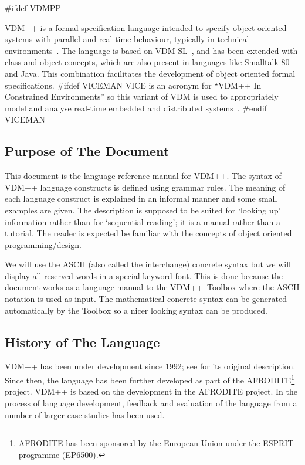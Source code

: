 \documentclass[\pformat,12pt]{article}
\newcommand{\vdmsl}{VDM-SL}
\newcommand{\vdmpp}{VDM++}
\begin{document}
#ifdef VDMPP

{\vdmpp} is a formal specification language intended to specify
object oriented systems with parallel 
and real-time 
behaviour,
typically in technical environments~\cite{Fitzgerald&05}.  The language is based on
\vdmsl~\cite{ISOVDM96}, and has been extended with class and object
concepts, which are also present in languages like Smalltalk-80 and
Java.  This combination facilitates the development of object oriented
formal specifications.  
#ifdef VICEMAN
VICE is an acronym for ``VDM++ In Constrained Environments'' so this
variant of VDM is used to appropriately model and analyse real-time
embedded and distributed systems~\cite{Verhoef&06b}.
#endif VICEMAN

\subsection{Purpose of The Document}

This document is the language reference manual for {\vdmpp}.  The
syntax of {\vdmpp} language constructs is defined using grammar rules.
The meaning of each language construct is explained in an informal
manner and some small examples are given. The description is supposed
to be suited for `looking up' information rather than for `sequential
reading'; it is a manual rather than a tutorial.  The reader is
expected be familiar with the concepts of object oriented
programming/design.

We will use the ASCII (also called the interchange)
concrete syntax but we will display all reserved words in a special
keyword font. This is done because the document works as a language
manual to the \vdmpp\ Toolbox where the ASCII notation is used as
input. The mathematical concrete syntax can be generated automatically
by the Toolbox so a nicer looking syntax can be produced.

\subsection{History of The Language}

{\vdmpp} has been under development since 1992; see \cite{Durr92a} for
its original description. Since then, the language has been further
developed as part of the AFRODITE\footnote{AFRODITE has been sponsored
by the European Union under the ESPRIT programme (EP6500).}
project. {\vdmpp} is based on the development in the AFRODITE
project.  In the process of language development, feedback and
evaluation of the language from a number of larger case studies has
been used.
\end{document}
